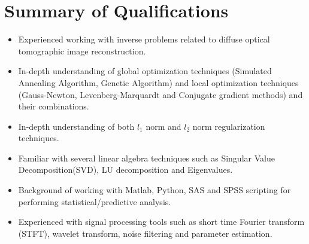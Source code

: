 \documentclass{my_cv}
\begin{document}
\vspace{-2mm}
\begin{center} 
\begin{footnotesize}
\end{footnotesize}

\href{https://www.linkedin.com/in/venkaiahchowdarykavuri}{\textcolor{linkedincolor}{\faLinkedinSquare}} \href{https://github.com/Venki-Kavuri}{\faGithub} \href{https://scholar.google.com/citations?hl=en&user=r5E9ACIAAAAJ&view_op=list_works}{\textcolor{gscholarcolor}{\aiGoogleScholar}} \href{https://www.facebook.com/venki.kavuri}{\textcolor{facebookcolor}{\faFacebookOfficial}}
\end{center} 

\vspace{-9mm} 

\section{Summary of Qualifications}
\begin{itemize}\itemsep 0pt

\item Experienced working with inverse problems related to diffuse optical tomographic image reconstruction.

\item In-depth understanding of global optimization techniques (Simulated Annealing Algorithm, Genetic Algorithm) and local optimization techniques (Gauss-Newton, Levenberg-Marquardt and Conjugate gradient methods) and their combinations.

\item In-depth understanding of both $l_1$ norm and $l_2$  norm regularization techniques.  

\item Familiar with several linear algebra techniques such as Singular Value Decomposition(SVD), LU decomposition and Eigenvalues. 

\item Background of working with Matlab, Python, SAS and SPSS scripting for performing statistical/predictive analysis.

\item Experienced with signal processing tools such as short time Fourier transform (STFT), wavelet transform, noise filtering and parameter estimation.
 

\end{itemize}
\vspace{-7mm}
\end{document}
